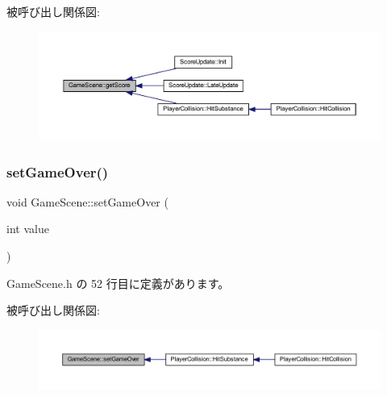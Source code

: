 被呼び出し関係図\+:
\nopagebreak
\begin{figure}[H]
\begin{center}
\leavevmode
\includegraphics[width=350pt]{class_game_scene_a16b26b3b8ea91dcaf762292414bf5d6d_icgraph}
\end{center}
\end{figure}
\mbox{\label{class_game_scene_abaefc8ae1bd5625d79da25120ef33a8e}} 
\subsubsection{\texorpdfstring{set\+Game\+Over()}{setGameOver()}}
{\footnotesize\ttfamily void Game\+Scene\+::set\+Game\+Over (\begin{DoxyParamCaption}\item[{int}]{value }\end{DoxyParamCaption})\hspace{0.3cm}{\ttfamily [inline]}}



 Game\+Scene.\+h の 52 行目に定義があります。

被呼び出し関係図\+:\nopagebreak
\begin{figure}[H]
\begin{center}
\leavevmode
\includegraphics[width=350pt]{class_game_scene_abaefc8ae1bd5625d79da25120ef33a8e_icgraph}
\end{center}
\end{figure}
\mbox{\label{class_game_scene_a1bd84ecb8d44bd5e57b4a2d772ef1bf9}} 
